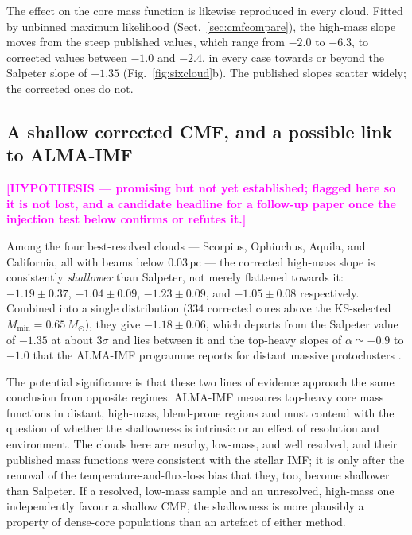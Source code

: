 \documentclass[11pt,a4paper]{article}
\newcommand{\note}[1]{\textcolor{magenta}{\textbf{[#1]}}}
\newcommand{\msun}{M_{\odot}}
\begin{document}
The effect on the core mass function is likewise reproduced in every cloud.
Fitted by unbinned maximum likelihood (Sect.~\ref{sec:cmfcompare}), the
high-mass slope moves from the steep published values, which range from
$-2.0$ to $-6.3$, to corrected values between $-1.0$ and $-2.4$, in every case
towards or beyond the Salpeter slope of $-1.35$ (Fig.~\ref{fig:sixcloud}b).
The published slopes scatter widely; the corrected ones do not.

\subsection{A shallow corrected CMF, and a possible link to ALMA-IMF}
\label{sec:shallowcmf}
\note{HYPOTHESIS --- promising but not yet established; flagged here so it is
not lost, and a candidate headline for a follow-up paper once the injection
test below confirms or refutes it.}

Among the four best-resolved clouds --- Scorpius, Ophiuchus, Aquila, and
California, all with beams below $0.03$\,pc --- the corrected high-mass slope
is consistently \emph{shallower} than Salpeter, not merely flattened towards
it: $-1.19\pm0.37$, $-1.04\pm0.09$, $-1.23\pm0.09$, and $-1.05\pm0.08$
respectively. Combined into a single distribution ($334$ corrected cores above
the KS-selected $M_{\mathrm{min}}=0.65\,\msun$), they give $-1.18\pm0.06$,
which departs from the Salpeter value of $-1.35$ at about $3\sigma$ and lies
between it and the top-heavy slopes of $\alpha\simeq-0.9$ to $-1.0$ that the
ALMA-IMF programme reports for distant massive protoclusters
\citep[e.g.][]{Motte+2018}.

The potential significance is that these two lines of evidence approach the
same conclusion from opposite regimes. ALMA-IMF measures top-heavy core mass
functions in distant, high-mass, blend-prone regions and must contend with the
question of whether the shallowness is intrinsic or an effect of resolution and
environment. The clouds here are nearby, low-mass, and well resolved, and their
published mass functions were consistent with the stellar IMF; it is only after
the removal of the temperature-and-flux-loss bias that they, too, become
shallower than Salpeter. If a resolved, low-mass sample and an unresolved,
high-mass one independently favour a shallow CMF, the shallowness is more
plausibly a property of dense-core populations than an artefact of either
method.
\end{document}
